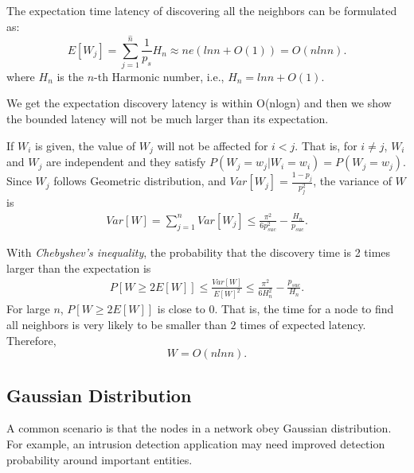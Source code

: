 The expectation time latency of discovering all the neighbors can be formulated as:
$$
E[W_j] = \sum_{j=1}^{\hat{n}}\frac{1}{p_s}H_n \approx ne(lnn + O(1)) = O(nlnn).
$$
where $H_n$ is the $n$-th Harmonic number, i.e.,
$H_n = lnn + O(1)$.

We get the expectation discovery latency is within O(nlogn) and then we
show the bounded latency will not be much larger than its expectation.

If $W_i$ is given, the value of $W_j$ will not be affected for $i<j$. That is, for $i\ne j$, $W_i$ and $W_j$ are independent and they satisfy $P(W_j=w_j|W_i=w_i)=P(W_j=w_j)$. Since $W_j$ follows Geometric distribution, and $Var[W_j]=\frac{1-p_j}{p_j^2}$, the variance of $W$ is
\begin{displaymath}
\begin{split}
 Var[W] %
 =\sum_{j=1}^{n}Var[W_j]
 \le\frac{\pi^2}{6p_{suc}^2}-\frac{H_n}{p_{suc}}.
\end{split}
\end{displaymath}

With \emph{Chebyshev's inequality}, the probability that the discovery time is 2 times larger than the expectation is
\begin{displaymath}
\begin{split}
P[W\ge2E[W]]%
\le\frac{Var[W]}{E[W]^2}
\le\frac{\pi^2}{6H_{n}^2}-\frac{p_{suc}}{H_n}.
\end{split}
\end{displaymath}
For large $n$, $P[W\ge2E[W]]$ is close to 0. That is, the time for a node to find all neighbors is very likely to be smaller than $2$ times of expected latency. Therefore,
\begin{equation*}
W=O(nlnn).
\end{equation*}












\subsection{Gaussian Distribution}
\label{normal}
A common scenario is that the nodes in a network obey Gaussian distribution.
For example, an intrusion detection application may need improved detection 
probability around important entities\cite{wang2013gaussian}.


